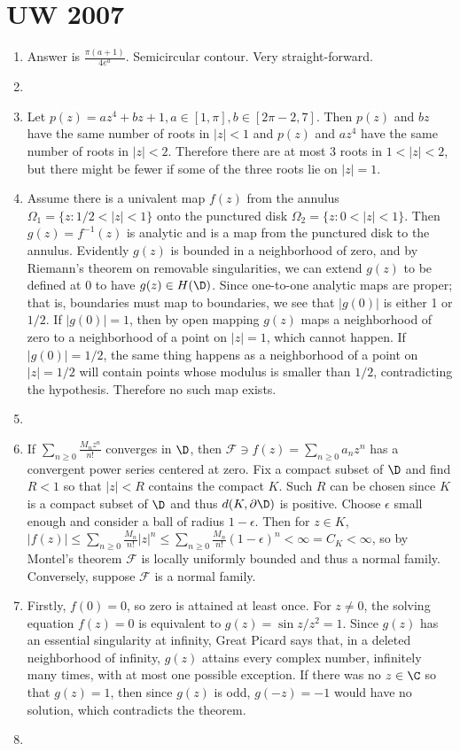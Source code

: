 \documentclass[11pt]{book}
\theoremstyle{definition}
\begin{document}
\section{UW 2007}
\begin{enumerate}
\item Answer is $\frac{\pi(a+1)}{4e^a}$. Semicircular contour. Very straight-forward.
\item
\item Let $p(z)=az^4+bz+1, a\in[1,\pi], b\in[2\pi-2,7]$. Then $p(z)$ and $bz$ have the same number of roots in $|z|<1$ and $p(z)$ and $az^4$ have the same number of roots in $|z|<2$. Therefore there are at most 3 roots in $1<|z|<2$, but there might be fewer if some of the three roots lie on $|z|=1$.
\item Assume there is a univalent map $f(z)$ from the annulus $\Omega_1=\{z: 1/2 < |z| < 1\}$ onto the punctured disk $\Omega_2=\{z: 0<|z|<1\}$. Then $g(z)=f^{-1}(z)$ is analytic and is a map from the punctured disk to the annulus. Evidently $g(z)$ is bounded in a neighborhood of zero, and by Riemann's theorem on removable singularities, we can extend $g(z)$ to be defined at 0 to have $g(z)\in H(\D)$. Since one-to-one analytic maps are proper; that is, boundaries must map to boundaries, we see that $|g(0)|$ is either 1 or $1/2$. If $|g(0)|=1$, then by open mapping $g(z)$ maps a neighborhood of zero to a neighborhood of a point on $|z|=1$, which cannot happen. If $|g(0)|=1/2$, the same thing happens as a neighborhood of a point on $|z|=1/2$ will contain points whose modulus is smaller than $1/2$, contradicting the hypothesis. Therefore no such map exists.     
\item
\item If $\sum_{n\geq0}\frac{M_nz^n}{n!}$ converges in $\D$, then $\mathcal{F}\ni f(z)=\sum_{n\geq0}a_nz^n$ has a convergent power series centered at zero. Fix a compact subset of $\D$ and find $R<1$ so that $|z|<R$ contains the compact $K$. Such $R$ can be chosen since $K$ is a compact subset of $\D$ and thus $d(K,\partial\D)$ is positive. Choose $\epsilon$ small enough and consider a ball of radius $1-\epsilon$. Then for $z\in K$, $|f(z)|\leq \sum_{n\geq0}\frac{M_n}{n!}|z|^n\leq \sum_{n\geq0}\frac{M_n}{n!}(1-\epsilon)^n<\infty=C_K<\infty$, so by Montel's theorem $\mathcal{F}$ is locally uniformly bounded and thus a normal family.
\\
Conversely, suppose $\mathcal{F}$ is a normal family.
\item Firstly, $f(0)=0$, so zero is attained at least once. For $z\neq0$, the solving equation $f(z)=0$ is equivalent to $g(z)=\sin z/z^2=1$. Since $g(z)$ has an essential singularity at infinity, Great Picard says that, in a deleted neighborhood of infinity, $g(z)$ attains every complex number, infinitely many times, with at most one possible exception. If there was no $z\in \C$ so that $g(z)=1$, then since $g(z)$ is odd, $g(-z)=-1$ would have no solution, which contradicts the theorem.
\item
\end{enumerate}
\end{document}
